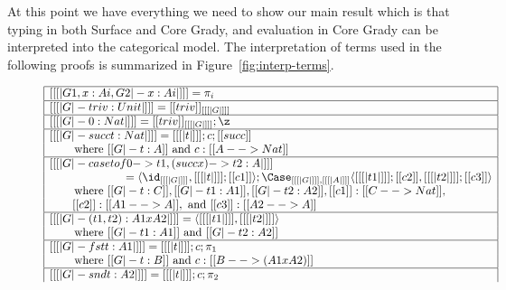 At this point we have everything we need to show our main result which
is that typing in both Surface and Core Grady, and evaluation in Core
Grady can be interpreted into the categorical model.  The
interpretation of terms used in the following proofs is summarized in
Figure~\ref{fig:interp-terms}.
\begin{figure}
  \small  
    \begin{center}
      \begin{math}
          \begin{array}{|l|}
            \hline
            [[ [| G1 , x : Ai , G2 |- x : Ai |] ]] = \pi_i\\
            \hline
            [[ [| G |- triv : Unit |] ]] = [[triv]]_{[[ [| G |] ]]}\\
            \hline
            [[ [| G |- 0 : Nat |] ]] = [[triv]]_{[[ [| G |] ]]};\z\\
            \hline
            [[ [| G |- succ t : Nat |] ]] = [[ [| t |] ]];c;[[succ]]\\
            \,\,\,\,\,\,\,\,\,\,\,\text{ where } [[G |- t : A]]\text{ and }c : [[A --> Nat]]\\
            \hline
            [[ [| G |- case t of 0 -> t1, (succ x) -> t2 : A |] ]]\\
            \,\,\,\,\,\,\,\,\,\,\,\,\,\,\,\,\,\,\,\,\,\,\,\,\,\,\,\,\,\,\,\,\,\,\,\,\,\,\,\,           
     = \langle \id_{[[ [| G |] ]]}, [[ [| t |] ]];[[c1]] \rangle;\Case_{[[ [| G |] ]], [[ [| A |] ]]}\langle [[ [|t1|] ]];[[c2]], [[ [| t2 |] ]];[[c3]] \rangle\\
     \,\,\,\,\,\,\,\,\,\,\,\text{ where } [[G |- t : C]], [[G |- t1 : A1]], [[G |- t2 : A2]], [[c1]] : [[C --> Nat]],\\
     \,\,\,\,\,\,\,\,\,\,\,\,[[c2]] : [[A1 --> A]], \text{ and } [[c3]] : [[A2 --> A]]\\
            \hline
            [[ [| G |- (t1,t2) : A1 x A2 |] ]] = \langle [[ [| t1 |] ]] , [[ [| t2 |] ]] \rangle\\
            \,\,\,\,\,\,\,\,\,\,\,\text{ where } [[G |- t1 : A1]]\text{ and } [[G |- t2 : A2]]\\
            \hline
            [[ [| G |- fst t : A1 |] ]] = [[ [| t |] ]];c;\pi_1\\
            \,\,\,\,\,\,\,\,\,\,\,\text{ where } [[G |- t : B]]\text{ and }c : [[B --> (A1 x A2)]]\\
            \hline
            [[ [| G |- snd t : A2 |] ]] = [[ [| t |] ]];c;\pi_2\\           

\end{array}
\end{math}
\end{center}
\end{figure}
